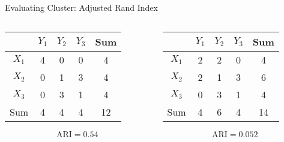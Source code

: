 \documentclass{beamer}
\begin{document}
	\begin{frame}{Evaluating Cluster: Adjusted Rand Index}
		
		\begin{columns}
			\begin{column}{0.48\linewidth}
			\begin{table}[htbp]
				\centering
				\begin{tabular}{c|c|c|c|c}
					&$Y_1$ & $Y_2$ & $Y_3$ & Sum \\
					\hline
					$X_1$ & 4  & 0  &  0 & 4 \\
					\hline
					$X_2$ & 0 & 1 & 3 & 4\\
					\hline
					$X_3$ & 0 & 3 & 1 & 4\\
					\hline					
					Sum & 4 & 4 & 4 & 12  
				\end{tabular}
			\end{table}
			
			$$  \text{ARI} = 0.54  $$
		\end{column}
		\pause
		\begin{column}{0.48\linewidth}
			\begin{table}[htbp]
				\centering
				\begin{tabular}{c|c|c|c|c}
					&$Y_1$ & $Y_2$ & $Y_3$ & Sum \\
					\hline
					$X_1$ & 2  & 2  &  0 & 4 \\
					\hline
					$X_2$ & 2 & 1 & 3 & 6\\
					\hline
					$X_3$ & 0 & 3 & 1 & 4\\
					\hline					
					Sum & 4 & 6 & 4 & 14  
				\end{tabular}
			\end{table}

			$$  \text{ARI} = 0.052  $$			
			
		\end{column}
		\end{columns}	
		
	\end{frame}	
	
\end{document}
